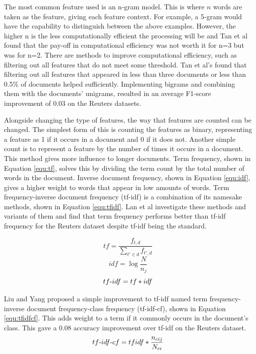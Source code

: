 			The most common feature used is an n-gram model. This is where $n$ words are taken as the feature, giving each feature context. For example, a 5-gram would have the capability to distinguish between the above examples. However, the higher n is the less computationally efficient the processing will be and Tan et al found that the pay-off in computational efficiency was not worth it for n=3 but was for n=2\cite{bigrams_enhance_tan}. There are methods to improve computational efficiency, such as filtering out all features that do not meet some threshold. Tan et al's found that filtering out all features that appeared in less than three documents or less than 0.5\% of documents helped sufficiently. Implementing bigrams and combining them with the documents' unigrams, resulted in an average F1-score improvement of 0.03 on the Reuters datasets\cite{bigrams_enhance_tan}. 

			Alongside changing the type of features, the way that features are counted can be changed. The simplest form of this is counting the features as binary, representing a feature as 1 if it occurs in a document and 0 if it does not. Another simple count is to represent a feature by the number of times it occurs in a document. This method gives more influence to longer documents. Term frequency, shown in Equation \ref{equ:tf}, solves this by dividing the term count by the total number of words in the document. Inverse document frequency, shown in Equation \ref{equ:idf}, gives a higher weight to words that appear in low amounts of words. Term frequency-inverse document frequency (tf-idf) is a combination of its namesake methods, shown in Equation \ref{equ:tfidf}. Lan et al investigate these methods and variants of them and find that term frequency performs better than tf-idf frequency for the Reuters dataset despite tf-idf being the standard.
			
			\begin{equation}\label{equ:tf}
				tf = \frac{f_{t,d}}{\sum_{t' \in d}f_{t',d}} 
			\end{equation}
			\begin{equation}\label{equ:idf}
				idf = \log \frac{N}{n_j}
			\end{equation}
			\begin{equation}\label{equ:tfidf}
				tf\textnormal{-}idf = tf * idf
			\end{equation}
			
			Liu and Yang proposed a simple improvement to tf-idf named term frequency-inverse document frequency-class frequency (tf-idf-cf), shown in Equation \ref{equ:tfidfcf}\cite{tfidfcf_categorization_liu}. This adds weight to a term if it commonly occurs in the document's class. This gave a 0.08 accuracy improvement over tf-idf on the Reuters dataset.
			\begin{equation}\label{equ:tfidfcf}
				tf\textnormal{-}idf\textnormal{-}cf = tfidf * \frac{n_{cij}}{N_{ci}}
			\end{equation}
